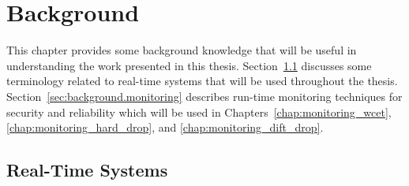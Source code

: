 \chapter{Background}
\label{chap:background}

This chapter provides some background knowledge that will be useful in
understanding the work presented in this thesis.
Section~\ref{sec:background.rts} discusses some terminology related to
real-time systems that will be used throughout the thesis.
Section~\ref{sec:background.monitoring} describes run-time monitoring
techniques for security and reliability which will be used in
Chapters~\ref{chap:monitoring_wcet}, \ref{chap:monitoring_hard_drop}, and
\ref{chap:monitoring_dift_drop}.

\section{Real-Time Systems}
\label{sec:background.rts}

